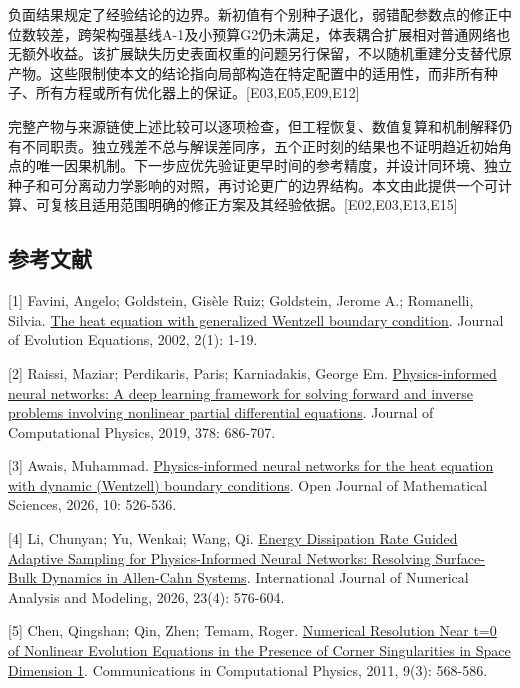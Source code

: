 \documentclass[11pt,a4paper]{article}
\begin{document}
负面结果规定了经验结论的边界。新初值有个别种子退化，弱错配参数点的修正中位数较差，跨架构强基线A-1及小预算G2仍未满足，体表耦合扩展相对普通网络也无额外收益。该扩展缺失历史表面权重的问题另行保留，不以随机重建分支替代原产物。这些限制使本文的结论指向局部构造在特定配置中的适用性，而非所有种子、所有方程或所有优化器上的保证。{[}E03,E05,E09,E12{]}

完整产物与来源链使上述比较可以逐项检查，但工程恢复、数值复算和机制解释仍有不同职责。独立残差不总与解误差同序，五个正时刻的结果也不证明趋近初始角点的唯一因果机制。下一步应优先验证更早时间的参考精度，并设计同环境、独立种子和可分离动力学影响的对照，再讨论更广的边界结构。本文由此提供一个可计算、可复核且适用范围明确的修正方案及其经验依据。{[}E02,E03,E13,E15{]}

\subsection{参考文献}\label{ux53c2ux8003ux6587ux732e}

{[}1{]} Favini, Angelo; Goldstein, Gisèle Ruiz; Goldstein, Jerome A.; Romanelli, Silvia. \href{https://doi.org/10.1007/s00028-002-8077-y}{The heat equation with generalized Wentzell boundary condition}. Journal of Evolution Equations, 2002, 2(1): 1-19.

{[}2{]} Raissi, Maziar; Perdikaris, Paris; Karniadakis, George Em. \href{https://doi.org/10.1016/j.jcp.2018.10.045}{Physics-informed neural networks: A deep learning framework for solving forward and inverse problems involving nonlinear partial differential equations}. Journal of Computational Physics, 2019, 378: 686-707.

{[}3{]} Awais, Muhammad. \href{https://doi.org/10.30538/oms2026.0303}{Physics-informed neural networks for the heat equation with dynamic (Wentzell) boundary conditions}. Open Journal of Mathematical Sciences, 2026, 10: 526-536.

{[}4{]} Li, Chunyan; Yu, Wenkai; Wang, Qi. \href{https://doi.org/10.4208/ijnam2026-1025}{Energy Dissipation Rate Guided Adaptive Sampling for Physics-Informed Neural Networks: Resolving Surface-Bulk Dynamics in Allen-Cahn Systems}. International Journal of Numerical Analysis and Modeling, 2026, 23(4): 576-604.

{[}5{]} Chen, Qingshan; Qin, Zhen; Temam, Roger. \href{https://doi.org/10.4208/cicp.110909.160310s}{Numerical Resolution Near t=0 of Nonlinear Evolution Equations in the Presence of Corner Singularities in Space Dimension 1}. Communications in Computational Physics, 2011, 9(3): 568-586.
\end{document}
